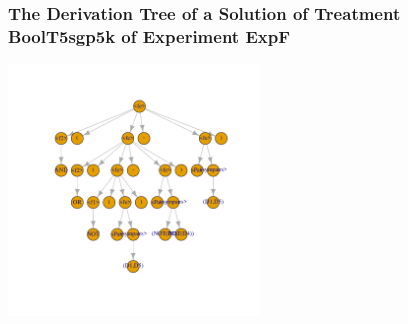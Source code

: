  \begin{frame}
 \frametitle{ The Derivation Tree of a Solution of Treatment BoolT5sgp5k of Experiment ExpF }
 \begin{center}
\includegraphics[width=0.5\textwidth, angle=0]
{ExpFDerivationTreeFigure006.pdf}
 \end{center}
 \label{report/ExpFDerivationTreeFigure006.pdf}  
 \end{frame}


